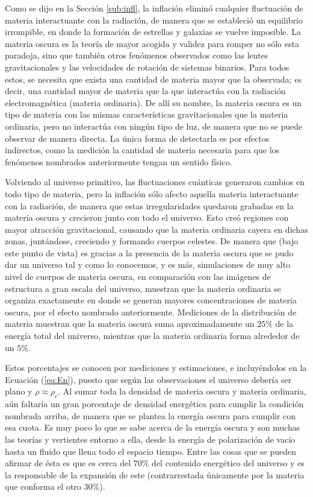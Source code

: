 Como se dijo en la Sección \ref{sub:infl}, la inflación eliminó cualquier fluctuación de materia interactuante con la radiación, de manera que se estableció un equilibrio irrompible, en donde la formación de estrellas y galaxias se vuelve imposible. La materia oscura es la teoría de mayor acogida y validez para romper no sólo esta paradoja, sino que también otros fenómenos observados como las lentes gravitacionales y las velocidades de rotación de sistemas binarios. Para todos estos, se necesita que exista una cantidad de materia mayor que la observada; es decir, una cantidad mayor de materia que la que interactúa con la radiación electromagnética (materia ordinaria). De allí su nombre, la materia oscura es un tipo de materia con las mismas características gravitacionales que la materia ordinaria, pero no interactúa con ningún tipo de luz, de manera que no se puede observar de manera directa. La única forma de detectarla es por efectos indirectos, como la medición la cantidad de materia necesaria para que los fenómenos nombrados anteriormente tengan un sentido físico. 

Volviendo al universo primitivo, las fluctuaciones cuánticas generaron cambios en todo tipo de materia, pero la inflación sólo afecto aquella materia interactuante con la radiación, de manera que estas irregularidades quedaron grabadas en la materia oscura y crecieron junto con todo el universo. Esto creó regiones con mayor atracción gravitacional, causando que la materia ordinaria cayera en dichas zonas, juntándose, creciendo y formando cuerpos celestes. De manera que (bajo este punto de vista) es gracias a la presencia de la materia oscura que se pudo dar un universo tal y como lo conocemos, y es más, simulaciones de muy alto nivel de cuerpos de materia oscura, en comparación con las imágenes de estructura a gran escala del universo, muestran que la materia ordinaria se organiza exactamente en donde se generan mayores concentraciones de materia oscura, por el efecto nombrado anteriormente. Mediciones de la distribución de materia muestran que la materia oscura suma aproximadamente un $25\%$ de la energía total del universo, mientras que la materia ordinaria forma alrededor de un $5\%$. 

Estos porcentajes se conocen por mediciones y estimaciones, e incluyéndolos en la Ecuación (\ref{eq:En}), puesto que según las observaciones el universo debería ser plano y $\rho\approx\rho_c$. Al sumar toda la densidad de materia oscura y materia ordinaria, aún faltaría un gran porcentaje de densidad energética para cumplir la condición nombrada arriba, de manera que se plantea la energía oscura para cumplir con esa cuota. Es muy poco lo que se sabe acerca de la energía oscura y son muchas las teorías y vertientes entorno a ella, desde la energía de polarización de vacío hasta un fluido que llena todo el espacio tiempo. Entre las cosas que se pueden afirmar de ésta es que es cerca del $70\%$ del contenido energético del universo y es la responsable de la expansión de este (contrarrestada únicamente por la materia que conforma el otro $30\%$).

